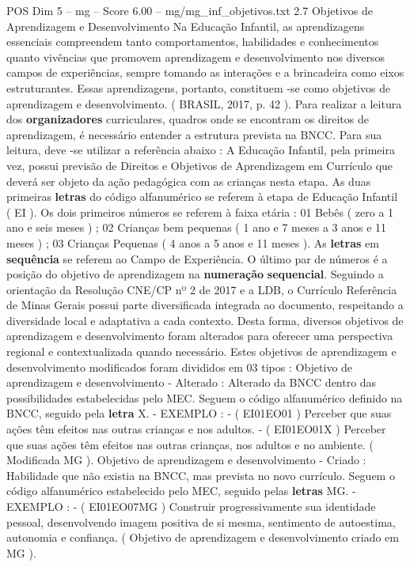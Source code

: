 \begin{textsample}{POS Dim 5 – mg – Score 6.00 – mg/mg\_inf\_objetivos.txt}  \label{ex:f5_pos_189}
2.7 Objetivos de Aprendizagem e Desenvolvimento Na Educação Infantil, as aprendizagens essenciais compreendem tanto comportamentos, habilidades e conhecimentos quanto vivências que promovem aprendizagem e desenvolvimento nos diversos campos de experiências, sempre tomando as interações e a brincadeira como eixos estruturantes.
Essas aprendizagens, portanto, constituem -se como objetivos de aprendizagem e desenvolvimento. ( BRASIL, 2017, p. 42 ).
Para realizar a leitura dos \textbf{organizadores} curriculares, quadros onde se encontram os direitos de aprendizagem, é necessário entender a estrutura prevista na BNCC.
Para sua leitura, deve -se utilizar a referência abaixo : A Educação Infantil, pela primeira vez, possui previsão de Direitos e Objetivos de Aprendizagem em Currículo que deverá ser objeto da ação pedagógica com as crianças nesta etapa.
As duas primeiras \textbf{letras} do código alfanumérico se referem à etapa de Educação Infantil ( EI ).
Os dois primeiros números se referem à faixa etária : 01 Bebês ( zero a 1 ano e seis meses ) ; 02 Crianças bem pequenas ( 1 ano e 7 meses a 3 anos e 11 meses ) ; 03 Crianças Pequenas ( 4 anos a 5 anos e 11 meses ).
As \textbf{letras} em \textbf{sequência} se referem ao Campo de Experiência.
O último par de números é a posição do objetivo de aprendizagem na \textbf{numeração} \textbf{sequencial}.
Seguindo a orientação da Resolução CNE/CP nº 2 de 2017 e a LDB, o Currículo Referência de Minas Gerais possui parte diversificada integrada ao documento, respeitando a diversidade local e adaptativa a cada contexto.
Desta forma, diversos objetivos de aprendizagem e desenvolvimento foram alterados para oferecer uma perspectiva regional e contextualizada quando necessário.
Estes objetivos de aprendizagem e desenvolvimento modificados foram divididos em 03 tipos : Objetivo de aprendizagem e desenvolvimento - Alterado : Alterado da BNCC dentro das possibilidades estabelecidas pelo MEC.
Seguem o código alfanumérico definido na BNCC, seguido pela \textbf{letra} X. - EXEMPLO : - ( EI01EO01 ) Perceber que suas ações têm efeitos nas outras crianças e nos adultos. - ( EI01EO01X ) Perceber que suas ações têm efeitos nas outras crianças, nos adultos e no ambiente. ( Modificada MG ).
Objetivo de aprendizagem e desenvolvimento - Criado : Habilidade que não existia na BNCC, mas prevista no novo currículo.
Seguem o código alfanumérico estabelecido pelo MEC, seguido pelas \textbf{letras} MG. - EXEMPLO : - ( EI01EO07MG ) Construir progressivamente sua identidade pessoal, desenvolvendo imagem positiva de si mesma, sentimento de autoestima, autonomia e confiança. ( Objetivo de aprendizagem e desenvolvimento criado em MG ).

\end{textsample}
